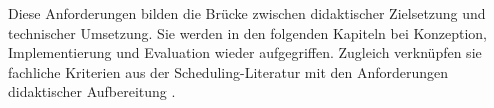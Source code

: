Diese Anforderungen bilden die Brücke zwischen didaktischer Zielsetzung und technischer Umsetzung. Sie werden in den folgenden Kapiteln bei Konzeption, Implementierung und Evaluation wieder aufgegriffen. Zugleich verknüpfen sie fachliche Kriterien aus der Scheduling-Literatur mit den Anforderungen didaktischer Aufbereitung \cite{tanenbaum2014modern,silberschatz2018operating}.
